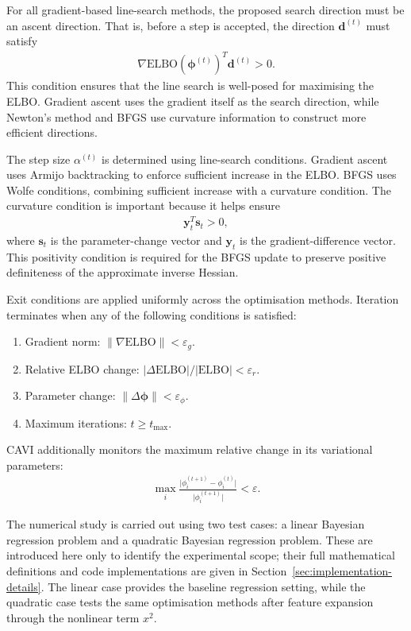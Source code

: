 \documentclass[11pt,a4paper]{article}
\newcommand{\ELBO}{\text{ELBO}}
\begin{document}
For all gradient-based line-search methods, the proposed search direction must be an ascent direction. That is, before a step is accepted, the direction $\bm{d}^{(t)}$ must satisfy
\begin{align}
\nabla \ELBO(\bm{\phi}^{(t)})^T \bm{d}^{(t)} > 0.
\end{align}
This condition ensures that the line search is well-posed for maximising the ELBO. Gradient ascent uses the gradient itself as the search direction, while Newton's method and BFGS use curvature information to construct more efficient directions.

The step size $\alpha^{(t)}$ is determined using line-search conditions. Gradient ascent uses Armijo backtracking to enforce sufficient increase in the ELBO. BFGS uses Wolfe conditions, combining sufficient increase with a curvature condition. The curvature condition is important because it helps ensure
\begin{align}
\bm{y}_t^T \bm{s}_t > 0,
\end{align}
where $\bm{s}_t$ is the parameter-change vector and $\bm{y}_t$ is the gradient-difference vector. This positivity condition is required for the BFGS update to preserve positive definiteness of the approximate inverse Hessian.

Exit conditions are applied uniformly across the optimisation methods. Iteration terminates when any of the following conditions is satisfied:
\begin{enumerate}[label=(\roman*)]
  \item Gradient norm: $\lVert \nabla \ELBO \rVert < \varepsilon_g$.
  \item Relative ELBO change: $\lvert \Delta \ELBO \rvert / \lvert \ELBO \rvert < \varepsilon_r$.
  \item Parameter change: $\lVert \Delta \bm{\phi} \rVert < \varepsilon_\phi$.
  \item Maximum iterations: $t \geq t_{\max}$.
\end{enumerate}
CAVI additionally monitors the maximum relative change in its variational parameters:
\begin{align}
\max_i \frac{\lvert \phi_i^{(t+1)} - \phi_i^{(t)} \rvert}{\lvert \phi_i^{(t+1)} \rvert} < \varepsilon.
\end{align}

The numerical study is carried out using two test cases: a linear Bayesian regression problem and a quadratic Bayesian regression problem. These are introduced here only to identify the experimental scope; their full mathematical definitions and code implementations are given in Section~\ref{sec:implementation-details}. The linear case provides the baseline regression setting, while the quadratic case tests the same optimisation methods after feature expansion through the nonlinear term $x^2$.
\end{document}
